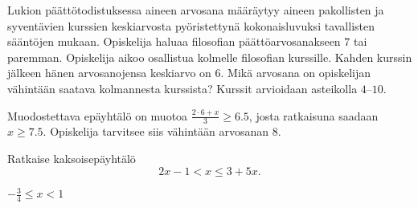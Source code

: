 \begin{tehtavasivu}
\begin{tehtava}
Lukion päättötodistuksessa aineen arvosana määräytyy aineen pakollisten ja syventävien kurssien keskiarvosta pyöristettynä kokonaisluvuksi tavallisten sääntöjen mukaan. Opiskelija haluaa filosofian päättöarvosanakseen $7$ tai paremman. Opiskelija aikoo osallistua kolmelle filosofian kurssille. Kahden kurssin jälkeen hänen arvosanojensa keskiarvo on $6$. Mikä arvosana on opiskelijan vähintään saatava kolmannesta kurssista? Kurssit arvioidaan asteikolla 
$4$--$10$.
\begin{vastaus}
Muodostettava epäyhtälö on muotoa $\frac{2\cdot 6+x}{3}\geq 6.5$, josta ratkaisuna saadaan $x\geq7.5$. Opiskelija tarvitsee siis vähintään arvosanan $8$.
\end{vastaus}
\end{tehtava}

\begin{tehtava}
Ratkaise kaksoisepäyhtälö
\[ 2x-1 < x \leq 3+5x.  \]
    \begin{vastaus}
        $-\frac{3}{4} \leq x < 1$
    \end{vastaus}
\end{tehtava}

\end{tehtavasivu}